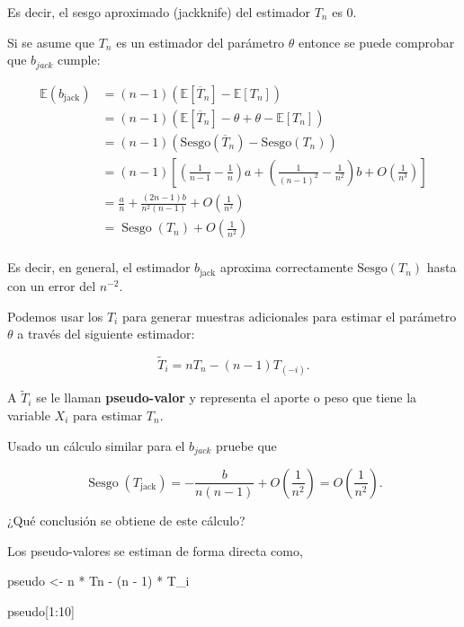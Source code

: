 \documentclass[
  12pt,
]{book}
\newenvironment{Shaded}{\begin{snugshade}}{\end{snugshade}}
\newcommand{\DecValTok}[1]{\textcolor[rgb]{0.00,0.00,0.81}{#1}}
\newcommand{\NormalTok}[1]{#1}
\newcommand{\OtherTok}[1]{\textcolor[rgb]{0.56,0.35,0.01}{#1}}
\newcommand{\SpecialCharTok}[1]{\textcolor[rgb]{0.00,0.00,0.00}{#1}}
\begin{document}
Es decir, el sesgo aproximado (jackknife) del estimador \(T_n\) es 0.

Si se asume que \(T_n\) es un estimador del parámetro \(\theta\) entonce
se puede comprobar que \(b_{jack}\) cumple:

\begin{align*}
\mathbb{E}\left(b_{\text {jack}}\right)
&= (n-1)\left(\mathbb{E}\left[\overline{T}_{n}\right] -
\mathbb{E}\left[T_{n}\right]\right) \\
&= (n-1)\left(\mathbb{E}\left[\overline{T}_{n}\right] - \theta +
\theta - \mathbb{E}\left[T_{n}\right]\right) \\
& =(n-1)\left(\mathrm{Sesgo} \left(\overline{T}_{n}\right)
-\mathrm{Sesgo}\left(T_{n}\right)\right) \\
& =(n-1)\left[\left(\frac{1}{n-1}
-\frac{1}{n}\right)
a+\left(\frac{1}{(n-1)^{2}}
-\frac{1}{n^{2}}\right) b+O\left(\frac{1}{n^{3}}\right)\right] \\
& =\frac{a}{n}
+\frac{(2 n-1) b}{n^{2}(n-1)}
+O\left(\frac{1}{n^{2}}\right) \\
& =\operatorname{Sesgo}\left(T_{n}\right)
+O\left(\frac{1}{n^{2}}\right)\\
\end{align*}

Es decir, en general, el estimador \(b_{\text{jack}}\) aproxima
correctamente \(\mathrm{Sesgo}\left( T_{n} \right)\) hasta con un error
del \(n^{-2}\).

Podemos usar los \(T_i\) para generar muestras adicionales para estimar
el parámetro \(\theta\) a través del siguiente estimador:

\[
\widetilde{T}_{i}=n T_{n}-(n-1) T_{(-i)}.
\]

A \(\widetilde{T}_{i}\) se le llaman \textbf{pseudo-valor} y representa
el aporte o peso que tiene la variable \(X_{i}\) para estimar \(T_{n}\).

\leavevmode{}%
Usado un cálculo similar para el \(b_{jack}\) pruebe que

\[
\operatorname{Sesgo}\left(T_{\text {jack}
}\right)=-\frac{b}{n(n-1)}+O\left(\frac{1}{n^{2}}\right)=O\left(\frac{1}{n^{2}}\right).
\]

¿Qué conclusión se obtiene de este cálculo?

\leavevmode{}%
Los pseudo-valores se estiman de forma directa como,

\begin{Shaded}
\begin{Highlighting}[]
\NormalTok{pseudo }\OtherTok{\textless{}{-}}\NormalTok{ n }\SpecialCharTok{*}\NormalTok{ Tn }\SpecialCharTok{{-}}\NormalTok{ (n }\SpecialCharTok{{-}} \DecValTok{1}\NormalTok{) }\SpecialCharTok{*}\NormalTok{ T\_i}

\NormalTok{pseudo[}\DecValTok{1}\SpecialCharTok{:}\DecValTok{10}\NormalTok{]}
\end{Highlighting}
\end{Shaded}
\end{document}
